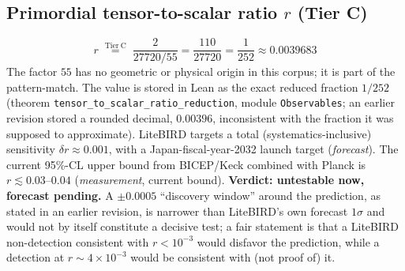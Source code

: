 \documentclass[11pt,a4paper]{article}
\theoremstyle{remark}
\begin{document}
\subsection{Primordial tensor-to-scalar ratio \texorpdfstring{$r$}{r} (Tier C)}
\begin{equation}
    r \;\overset{\mathrm{Tier\ C}}{=}\; \frac{2}{27720/55} = \frac{110}{27720} = \frac{1}{252} \approx 0.0039683
\end{equation}
The factor $55$ has no geometric or physical origin in this corpus; it is part of the pattern-match.
The value is stored in Lean as the exact reduced fraction $1/252$ (theorem
\texttt{tensor\_to\_scalar\_ratio\_reduction}, module \texttt{Observables}; an earlier revision
stored a rounded decimal, $0.00396$, inconsistent with the fraction it was supposed to
approximate). LiteBIRD targets a total
(systematics-inclusive) sensitivity $\delta r\approx0.001$, with a Japan-fiscal-year-2032 launch
target \cite{LiteBIRD2024} (\emph{forecast}). The current 95\%-CL upper bound from BICEP/Keck
combined with Planck is $r\lesssim0.03$--$0.04$ \cite{BicepKeck2021} (\emph{measurement}, current
bound). \textbf{Verdict: untestable now, forecast pending.} A $\pm0.0005$ ``discovery window'' around
the prediction, as stated in an earlier revision, is narrower than LiteBIRD's own forecast
$1\sigma$ and would not by itself constitute a decisive test; a fair statement is that a LiteBIRD
non-detection consistent with $r<10^{-3}$ would disfavor the prediction, while a detection at
$r\sim4\times10^{-3}$ would be consistent with (not proof of) it.
\end{document}
